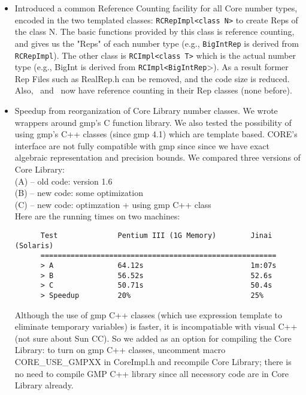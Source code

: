 \documentclass[12pt]{article}
\begin{document}
\begin{itemize}
   \item Introduced a common Reference Counting facility for all
         Core number types, encoded in the two templated classes:
                \texttt{RCRepImpl<class N>}
      to create Reps of the class N.  The basic functions provided by
      this class is reference counting, and gives us the "Reps" of
      each number type (e.g., \texttt{BigIntRep}
      is derived from \texttt{RCRepImpl}).  
      The other class is
                \texttt{RCImpl<class T>}
      which is the actual number type (e.g., BigInt is derived
      from \texttt{RCImpl<BigIntRep}>).  As a result former Rep Files
      such as RealRep.h can be removed, and the code size is reduced.
      Also, \Int\ and \Rat\ now have reference counting in
      their Rep classes (none before).
   \item Speedup from reorganization of Core Library number classes.
      We wrote wrappers around gmp's C function library.
      We also tested the possibility of using gmp's C++ classes (since
      gmp 4.1) which are template based.  CORE's interface are not fully
      compatible with gmp since since we have exact algebraic representation
      and precision bounds.
      We compared three versions of Core Library:
           \\
           (A) -- old code: version 1.6
	   \\
           (B) -- new code: some optimization
	   \\
           (C) -- new code: optimzation + using gmp C++ class
      \\Here are the running times on two machines:
      \begin{verbatim}
      Test              Pentium III (1G Memory)        Jinai (Solaris)
      =======================================================
      > A               64.12s                         1m:07s
      > B               56.52s                         52.6s
      > C               50.71s                         50.4s
      > Speedup         20%                            25%
      \end{verbatim}
    
      Although the use of gmp C++ classes (which use expression template
      to eliminate temporary variables) is faster, it is
      incompatiable with visual C++ (not sure about Sun CC).
      So we added as an option for compiling the Core Library:
      to turn on gmp C++ classes, uncomment macro CORE\_USE\_GMPXX
      in CoreImpl.h and recompile Core Library; there is no need to compile
      GMP C++ library since all necessory code are in Core Library already.


\end{itemize}
\end{document}
